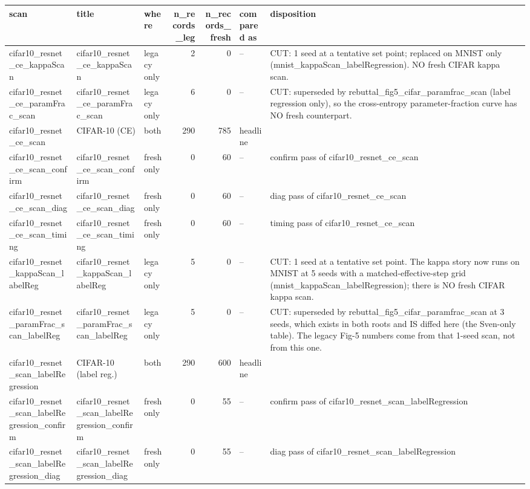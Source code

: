 \begin{tabular}{lllrrll}
\toprule
scan & title & where & n\_records\_leg & n\_records\_fresh & compared as & disposition \\
\midrule
cifar10\_resnet\_ce\_kappaScan & cifar10\_resnet\_ce\_kappaScan & legacy only & 2 & 0 & -- & CUT: 1 seed at a tentative set point; replaced on MNIST only (mnist\_kappaScan\_labelRegression). NO fresh CIFAR kappa scan. \\
cifar10\_resnet\_ce\_paramFrac\_scan & cifar10\_resnet\_ce\_paramFrac\_scan & legacy only & 6 & 0 & -- & CUT: superseded by rebuttal\_fig5\_cifar\_paramfrac\_scan (label regression only), so the cross-entropy parameter-fraction curve has NO fresh counterpart. \\
cifar10\_resnet\_ce\_scan & CIFAR-10 (CE) & both & 290 & 785 & headline &  \\
cifar10\_resnet\_ce\_scan\_confirm & cifar10\_resnet\_ce\_scan\_confirm & fresh only & 0 & 60 & -- & confirm pass of cifar10\_resnet\_ce\_scan \\
cifar10\_resnet\_ce\_scan\_diag & cifar10\_resnet\_ce\_scan\_diag & fresh only & 0 & 60 & -- & diag pass of cifar10\_resnet\_ce\_scan \\
cifar10\_resnet\_ce\_scan\_timing & cifar10\_resnet\_ce\_scan\_timing & fresh only & 0 & 60 & -- & timing pass of cifar10\_resnet\_ce\_scan \\
cifar10\_resnet\_kappaScan\_labelReg & cifar10\_resnet\_kappaScan\_labelReg & legacy only & 5 & 0 & -- & CUT: 1 seed at a tentative set point. The kappa story now runs on MNIST at 5 seeds with a matched-effective-step grid (mnist\_kappaScan\_labelRegression); there is NO fresh CIFAR kappa scan. \\
cifar10\_resnet\_paramFrac\_scan\_labelReg & cifar10\_resnet\_paramFrac\_scan\_labelReg & legacy only & 5 & 0 & -- & CUT: superseded by rebuttal\_fig5\_cifar\_paramfrac\_scan at 3 seeds, which exists in both roots and IS diffed here (the Sven-only table). The legacy Fig-5 numbers come from that 1-seed scan, not from this one. \\
cifar10\_resnet\_scan\_labelRegression & CIFAR-10 (label reg.) & both & 290 & 600 & headline &  \\
cifar10\_resnet\_scan\_labelRegression\_confirm & cifar10\_resnet\_scan\_labelRegression\_confirm & fresh only & 0 & 55 & -- & confirm pass of cifar10\_resnet\_scan\_labelRegression \\
cifar10\_resnet\_scan\_labelRegression\_diag & cifar10\_resnet\_scan\_labelRegression\_diag & fresh only & 0 & 55 & -- & diag pass of cifar10\_resnet\_scan\_labelRegression \\

\end{tabular}
